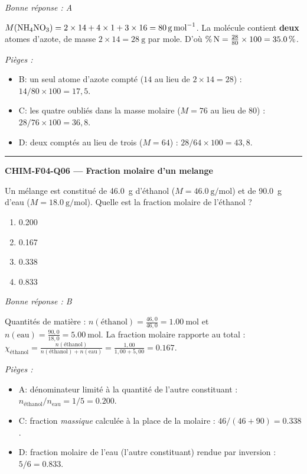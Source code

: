 \documentclass[11pt,a4paper]{article}
\begin{document}
\textit{Bonne réponse : A}\par
$M(\ce{NH4NO3}) = 2\times 14 + 4\times 1 + 3\times 16 = \qty{80}{\gram\per\mole}$. La molécule contient \textbf{deux} atomes d'azote, de masse $2\times 14 = \qty{28}{\gram}$ par mole. D'où $\%\,\ce{N} = \frac{28}{80}\times 100 = \qty{35.0}{\percent}$.\par
\textit{Pièges :}
\begin{itemize}
\item B: un seul atome d'azote compté ($14$ au lieu de $2\times 14 = 28$) : $14/80\times 100 = 17{,}5$.
\item C: les quatre  oubliés dans la masse molaire ($M = 76$ au lieu de $80$) : $28/76\times 100 = 36{,}8$.
\item D: deux  comptés au lieu de trois ($M = 64$) : $28/64\times 100 = 43{,}8$.
\end{itemize}
\vspace{8pt}\hrule\vspace{8pt}
\noindent\textbf{CHIM-F04-Q06 --- Fraction molaire d'un melange}\par
Un mélange est constitué de \qty{46.0}{\gram} d'éthanol  ($M = \qty{46.0}{\gram\per\mole}$) et de \qty{90.0}{\gram} d'eau ($M = \qty{18.0}{\gram\per\mole}$). Quelle est la fraction molaire de l'éthanol ?
\begin{enumerate}[label=\Alph*)]
\item \num{0.200}
\item \num{0.167}
\item \num{0.338}
\item \num{0.833}
\end{enumerate}
\textit{Bonne réponse : B}\par
Quantités de matière : $n(\text{éthanol}) = \frac{46{,}0}{46{,}0} = \qty{1.00}{\mole}$ et $n(\text{eau}) = \frac{90{,}0}{18{,}0} = \qty{5.00}{\mole}$. La fraction molaire rapporte au total : $\chi_{\text{éthanol}} = \frac{n(\text{éthanol})}{n(\text{éthanol}) + n(\text{eau})} = \frac{1{,}00}{1{,}00 + 5{,}00} = \num{0.167}$.\par
\textit{Pièges :}
\begin{itemize}
\item A: dénominateur limité à la quantité de l'autre constituant : $n_{\text{éthanol}}/n_{\text{eau}} = 1/5 = \num{0.200}$.
\item C: fraction \emph{massique} calculée à la place de la molaire : $46/(46+90) = \num{0.338}$.
\item D: fraction molaire de l'eau (l'autre constituant) rendue par inversion : $5/6 = \num{0.833}$.
\end{itemize}
\end{document}
